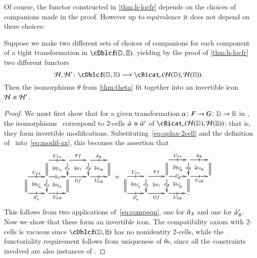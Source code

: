 Of course, the functor constructed in \cref{thm:h-locfr} depends on the choices of companions made in the proof.
However up to equivalence it does not depend on these choices:

\begin{lem}\label{thm:h-locfr-uniq}
  Suppose we make two different sets of choices of companions for each component of a tight transformation in $\cDblcf(\lD,\lE)$, yielding by the proof of \cref{thm:h-locfr} two different functors
  \[\cH,\cH'\maps \cDblcf(\lD,\lE)\too \cBicat_c(\cH(\lD),\cH(\lE)).\]
  Then the isomorphisms $\theta$ from \autoref{thm:theta} fit together
  into an invertible icon $\mathcal{H}\cong \mathcal{H}'$.
\end{lem}
\begin{proof}
  We must first show that for a given transformation $\alpha\colon F\to
  G\colon \mathbb{D}\to\mathbb{E}$ in \cDbl, the isomorphisms \th\ correspond to 2-cells $\hat{\alpha} \cong \hat{\alpha}'$ of $\cBicat_c(\cH(\lD),\cH(\lE))$; that is, they form invertible
  modifications.
  Substituting~\eqref{eq:oplax-2cell} and the definition of \th\
  into~\eqref{eq:modif-ax}, this becomes the assertion that
  \begin{equation}
    \vcenter{\xymatrix@R=1.5pc@C=2pc{
        &
        \ar[r]|-@{|}^{U_{FA}}\ar@{=}[d] \ar@{}[dr]|{\Downarrow \eta_{\hat{\alpha}_A}} &
        \ar[r]^{Ff}\ar[d]|{\al_A} \ar@{}[dr]|{\Downarrow \al_f} &
        \ar[r]|-@{|}^{\alhat_B}\ar[d]|{\al_B} \ar@{}[dr]|{\Downarrow \epsilon_{\hat{\alpha}_B}} &
        \ar@{=}[d]\\
        \ar[r]|-@{|}^{U_{FA}} \ar@{=}[d] \ar@{}[dr]|{\Downarrow \eta_{\hat{\alpha}_A'}} &
        \ar[r]|{\alhat_A} \ar[d]|{\al_A} \ar@{}[dr]|{\Downarrow \epsilon_{\hat{\alpha}_A}}&
        \ar[r]_{Gf}  \ar@{=}[d] &
        \ar[r]|-@{|}_{U_{GB}} & \\
        \ar[r]|-@{|}_{\alhat_A'} & \ar[r]|-@{|}_{U_{GB}}&&
      }} \;=\;
    \vcenter{\xymatrix@R=1.5pc@C=2pc{
        && \ar@{=}[d] \ar[r]|-@{|}^{U_{FA}} \ar@{}[dr]|{\Downarrow \eta_{\hat{\alpha}_B'}} &
        \ar[d]|{\al_B} \ar[r]|-@{|}^{\alhat_B} \ar@{}[dr]|{\Downarrow \epsilon_{\hat{\alpha}_B}}
        &
        \ar@{=}[d] &\\
        \ar[r]|-@{|}^{U_{FA}}\ar@{=}[d] \ar@{}[dr]|{\Downarrow \eta_{\hat{\alpha}_A'}} &
        \ar[r]^{Ff}\ar[d]|{\al_A} \ar@{}[dr]|{\Downarrow \al_f} &
        \ar[r]|{\alhat_B'}\ar[d]|{\al_B} \ar@{}[dr]|{\Downarrow \epsilon_{\hat{\alpha}_B'}} &
        \ar@{=}[d] \ar[r]|-@{|}_{U_{GB}}&\\
        \ar[r]|-@{|}_{\alhat_A'} &
        \ar[r]_{Gf} &
        \ar[r]|-@{|}_{U_{GB}} & .
      }}
  \end{equation}
  This follows from two applications of~\eqref{eq:compeqn}, one for
  $\hat{\alpha}_A$ and one for $\hat{\alpha}_B'$.
  Now we show that these form an invertible icon. The compatibility axiom with 2-cells is vacuous since $\cDblcf(\lD,\lE)$ has
  no nonidentity 2-cells, while the functoriality requirement follows from uniqueness of $\theta$s,
  since all the constraints involved are also instances of \th.
\end{proof}


